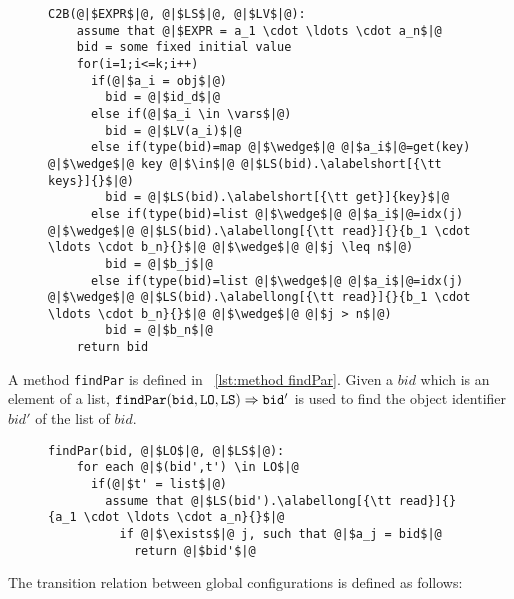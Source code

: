 \begin{figure}[t]
\begin{lstlisting}[basicstyle=\ttfamily\scriptsize,caption={\vspace{-1mm}Method {\tt C2B}.},captionpos=b,label={lst:method C2B}]
  C2B(@|$EXPR$|@, @|$LS$|@, @|$LV$|@):
    assume that @|$EXPR = a_1 \cdot \ldots \cdot a_n$|@
    bid = some fixed initial value
    for(i=1;i<=k;i++)
      if(@|$a_i = obj$|@)
        bid = @|$id_d$|@
      else if(@|$a_i \in \vars$|@)
        bid = @|$LV(a_i)$|@
      else if(type(bid)=map @|$\wedge$|@ @|$a_i$|@=get(key) @|$\wedge$|@ key @|$\in$|@ @|$LS(bid).\alabelshort[{\tt keys}]{}$|@)
        bid = @|$LS(bid).\alabelshort[{\tt get}]{key}$|@
      else if(type(bid)=list @|$\wedge$|@ @|$a_i$|@=idx(j) @|$\wedge$|@ @|$LS(bid).\alabellong[{\tt read}]{}{b_1 \cdot \ldots \cdot b_n}{}$|@ @|$\wedge$|@ @|$j \leq n$|@)
        bid = @|$b_j$|@
      else if(type(bid)=list @|$\wedge$|@ @|$a_i$|@=idx(j) @|$\wedge$|@ @|$LS(bid).\alabellong[{\tt read}]{}{b_1 \cdot \ldots \cdot b_n}{}$|@ @|$\wedge$|@ @|$j > n$|@)
        bid = @|$b_n$|@
    return bid
\end{lstlisting}
\vspace{-5mm}
\end{figure}

A method {\tt findPar} is defined in \figureautorefname~\ref{lst:method findPar}. Given a $bid$ which is an element of a list, $\alabellong[{\tt findPar}]{bid,LO,LS}{bid'}{}$ is used to find the object identifier $bid'$ of the list of $bid$.

\begin{figure}[t]
\begin{lstlisting}[basicstyle=\ttfamily\scriptsize,caption={\vspace{-1mm}Method {\tt findPar}.},captionpos=b,label={lst:method findPar}]
  findPar(bid, @|$LO$|@, @|$LS$|@):
    for each @|$(bid',t') \in LO$|@
      if(@|$t' = list$|@)
        assume that @|$LS(bid').\alabellong[{\tt read}]{}{a_1 \cdot \ldots \cdot a_n}{}$|@
          if @|$\exists$|@ j, such that @|$a_j = bid$|@
            return @|$bid'$|@
\end{lstlisting}
\vspace{-5mm}
\end{figure}

The transition relation between global configurations is defined as follows:

